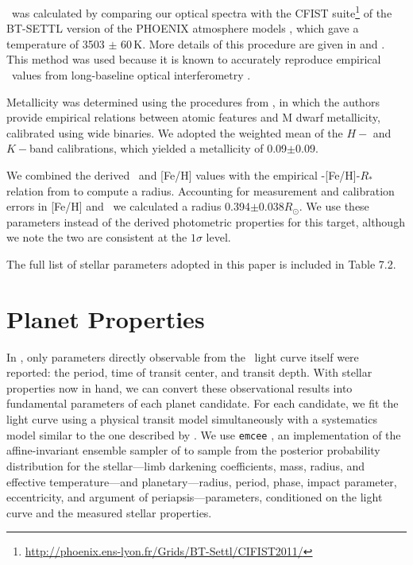 \teff\ was calculated by comparing our optical spectra with the CFIST
suite\footnote{\url{http://phoenix.ens-lyon.fr/Grids/BT-Settl/CIFIST2011/}} of the BT-SETTL
version of the PHOENIX atmosphere models \citep{Allard13}, which gave a temperature
of 3503 $\pm$ 60\,K.
More details of this procedure are given in \citet{Mann14} and
\citet{Gaidos14}.
This method was used because it is known to accurately reproduce empirical
\teff\ values from long-baseline optical interferometry \citet{Boyajian12}.

Metallicity was determined using the procedures from \citet{Mann13a}, in which the
authors provide empirical relations between atomic features and M dwarf
metallicity, calibrated using wide binaries.
We adopted the weighted mean of the $H-$ and $K-$band calibrations,
which yielded a metallicity of 0.09$\pm$0.09.

We combined the derived \teff\ and [Fe/H] values with the empirical
\teff-[Fe/H]-$R_*$ relation from \citet{Mann15} to compute a radius.
Accounting for measurement and calibration errors in [Fe/H] and \teff\ we calculated
a radius 0.394$\pm0.038R_\odot$.
We use these parameters instead of the derived photometric properties for this target,
although we note the two are consistent at the $1\sigma$ level.

The full list of stellar parameters adopted in this paper is included in
Table 7.2.

\section{Planet Properties}

In \paperit, only parameters directly observable from the \KT\ light curve
itself were reported: the period, time of transit center, and transit depth.
With stellar properties now in hand, we can convert these observational
results into fundamental parameters of each planet candidate.
For each candidate, we fit the light curve using a physical transit model
\citep{Mandel02, Kipping10b} simultaneously with a systematics model similar
to the one described by \paperit.
We use \texttt{emcee} \citep{Foreman-Mackey12}, an implementation of the
affine-invariant ensemble sampler of \citet{Goodman10}
 to sample from the posterior probability distribution
for the stellar---limb darkening coefficients, mass, radius, and effective
temperature---and planetary---radius, period, phase, impact parameter,
eccentricity, and argument of periapsis---parameters, conditioned on the
light curve and the measured stellar properties.



